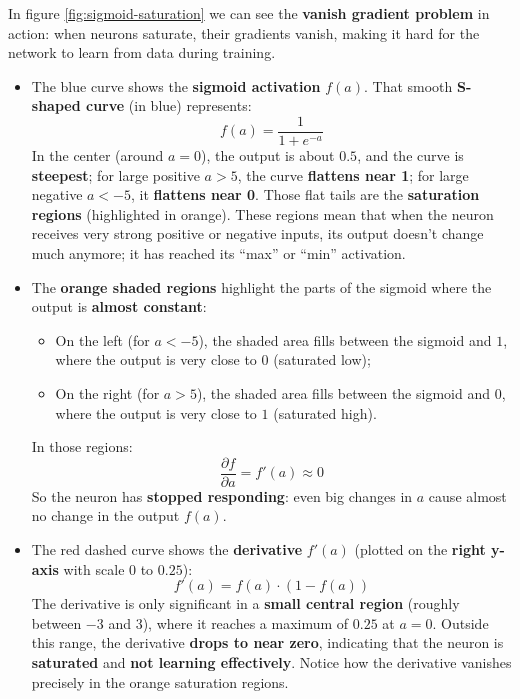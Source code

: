 \noindent
In figure \ref{fig:sigmoid-saturation} we can see the \textbf{vanish gradient problem} in action: when neurons saturate, their gradients vanish, making it hard for the network to learn from data during training.
\begin{itemize}
    \item The blue curve shows the \textbf{sigmoid activation} $f(a)$. That smooth \textbf{S-shaped curve} (in blue) represents:
    \begin{equation*}
        f(a) = \dfrac{1}{1 + e^{-a}}
    \end{equation*}
    In the center (around $a=0$), the output is about $0.5$, and the curve is \textbf{steepest}; for large positive $a>5$, the curve \textbf{flattens near 1}; for large negative $a<-5$, it \textbf{flattens near 0}. Those flat tails are the \textbf{saturation regions} (highlighted in orange). These regions mean that when the neuron receives very strong positive or negative inputs, its output doesn't change much anymore; it has reached its ``max'' or ``min'' activation.
    \item The \textbf{orange shaded regions} highlight the parts of the sigmoid where the output is \textbf{almost constant}:
    \begin{itemize}
        \item On the left (for $a < -5$), the shaded area fills between the sigmoid and $1$, where the output is very close to $0$ (saturated low);
        \item On the right (for $a > 5$), the shaded area fills between the sigmoid and $0$, where the output is very close to $1$ (saturated high).
    \end{itemize}
    In those regions:
    \begin{equation*}
        \dfrac{\partial f}{\partial a} = f'(a) \approx 0
    \end{equation*}
    So the neuron has \textbf{stopped responding}: even big changes in $a$ cause almost no change in the output $f(a)$.
    \item The red dashed curve shows the \textbf{derivative} $f'(a)$ (plotted on the \textbf{right y-axis} with scale $0$ to $0.25$):
    \begin{equation*}
        f'(a) = f(a) \cdot (1 - f(a))
    \end{equation*}
    The derivative is only significant in a \textbf{small central region} (roughly between $-3$ and $3$), where it reaches a maximum of $0.25$ at $a=0$. Outside this range, the derivative \textbf{drops to near zero}, indicating that the neuron is \textbf{saturated} and \textbf{not learning effectively}. Notice how the derivative vanishes precisely in the orange saturation regions.
\end{itemize}


